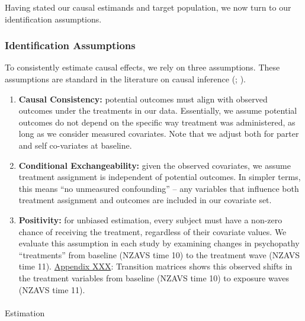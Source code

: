 \documentclass[
  single column]{article}
\makeatletter
\let\oldparagraph\paragraph
\renewcommand{\paragraph}{
    \@ifstar
      \xxxParagraphStar
      \xxxParagraphNoStar
  }
\newcommand{\xxxParagraphStar}[1]{\oldparagraph*{#1}\mbox{}}
\newcommand{\xxxParagraphNoStar}[1]{\oldparagraph{#1}\mbox{}}
\makeatother
\begin{document}
Having stated our causal estimands and target population, we now turn to
our identification assumptions.

\subsubsection{Identification
Assumptions}\label{identification-assumptions}

To consistently estimate causal effects, we rely on three assumptions.
These assumptions are standard in the literature on causal inference
(;
).

\begin{enumerate}
\def\labelenumi{\arabic{enumi}.}
\item
  \textbf{Causal Consistency:} potential outcomes must align with
  observed outcomes under the treatments in our data. Essentially, we
  assume potential outcomes do not depend on the specific way treatment
  was administered, as long as we consider measured covariates. Note
  that we adjust both for parter and self co-variates at baseline.
\item
  \textbf{Conditional Exchangeability:} given the observed covariates,
  we assume treatment assignment is independent of potential outcomes.
  In simpler terms, this means ``no unmeasured confounding'' -- any
  variables that influence both treatment assignment and outcomes are
  included in our covariate set.
\item
  \textbf{Positivity:} for unbiased estimation, every subject must have
  a non-zero chance of receiving the treatment, regardless of their
  covariate values. We evaluate this assumption in each study by
  examining changes in psychopathy ``treatments'' from baseline (NZAVS
  time 10) to the treatment wave (NZAVS time 11).
  \href{appendix-transition}{Appendix XXX}: Transition matrices shows
  this observed shifts in the treatment variables from baseline (NZAVS
  time 10) to exposure waves (NZAVS time 11).
\end{enumerate}

\paragraph{Estimation}\label{estimation}
\end{document}
